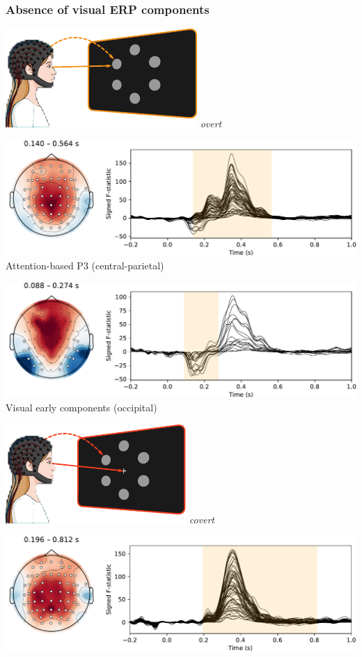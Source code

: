 \documentclass{kul-ulille-beamer}
\begin{document}
\begin{frame}
  \frametitle{Absence of visual ERP components}
  \footnotesize
  \begin{minipage}[t]{.45\textwidth}
    \includegraphics[width=.2\textwidth]{figures/covert/attention_overt.pdf}
    \hspace{.5em}
    \emph{overt}
    \smallskip

    \includegraphics[width=\textwidth]{figures/covert/erps/erp_overt_cluster-1.pdf}
    Attention-based P3 (central-parietal)
    \bigskip

    \includegraphics[width=\textwidth]{figures/covert/erps/erp_overt_cluster-0.pdf}
    Visual early components (occipital)
    \smallskip

  \end{minipage}\hfill%
  \begin{minipage}[t]{.45\textwidth}
    \includegraphics[width=.2\textwidth]{figures/covert/attention_covert.pdf}
    \hspace{.5em}
    \emph{covert}
    \smallskip

    \includegraphics[width=\textwidth]{figures/covert/erps/erp_covert_cluster-0.pdf}
    \smallskip


\end{minipage}
\end{frame}
\end{document}
